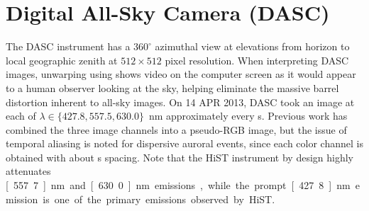 \section{Digital All-Sky Camera (DASC)}
The DASC instrument has a $360^\circ$ azimuthal view at elevations from horizon to local geographic zenith at $512 \times 512$ pixel resolution. 
When interpreting DASC images, unwarping using \citet{geodata} shows video on the computer screen as it would appear to a human observer looking at the sky, helping eliminate the massive barrel distortion inherent to all-sky images.
On 14 APR 2013, DASC took an image at each of $\lambda \in \lbrace 427.8, 557.5, 630.0 \rbrace$~nm approximately every \unit[13]{s}.
Previous work has combined the three image channels into a pseudo-RGB image, but the issue of temporal aliasing is noted for dispersive auroral events, since each color channel is obtained with about \unit[4]{s} spacing.
Note that the HiST instrument by design highly attenuates \unit[557.7]{nm} and \unit[630.0]{nm} emissions, while the prompt \unit[427.8]{nm} emission is one of the primary emissions observed by HiST.
